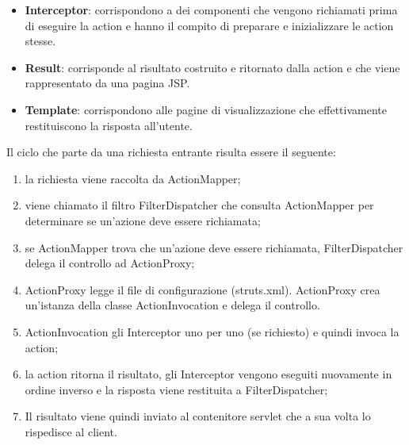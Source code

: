 \begin{itemize}
\item \textbf{Interceptor}: corrispondono a dei componenti che vengono richiamati prima di eseguire la action e hanno il compito di preparare e inizializzare le action stesse.
\setlength{\parskip}{3ex}

\item \textbf{Result}: corrisponde al risultato costruito e ritornato dalla action e che viene rappresentato da una pagina JSP.
\setlength{\parskip}{3ex}

\item \textbf{Template}: corrispondono alle pagine di visualizzazione che effettivamente restituiscono la risposta all'utente.
\setlength{\parskip}{3ex}

\end{itemize}

\pagebreak

\noindent Il ciclo che parte da una richiesta entrante risulta essere il seguente:
\begin{enumerate}
\item la richiesta viene raccolta da ActionMapper;

\item viene chiamato il filtro FilterDispatcher che consulta ActionMapper per determinare se un'azione deve essere richiamata;

\item se ActionMapper trova che un'azione deve essere richiamata, FilterDispatcher delega il controllo ad ActionProxy;

\item ActionProxy legge il file di configurazione (struts.xml). ActionProxy crea un'istanza della classe ActionInvocation e delega il controllo.

\item ActionInvocation gli Interceptor uno per uno (se richiesto) e quindi invoca la action;

\item la action ritorna il risultato, gli Interceptor vengono eseguiti nuovamente in ordine inverso e la risposta viene restituita a FilterDispatcher;

\item Il risultato viene quindi inviato al contenitore servlet che a sua volta lo rispedisce al client.
\end{enumerate}

\pagebreak
